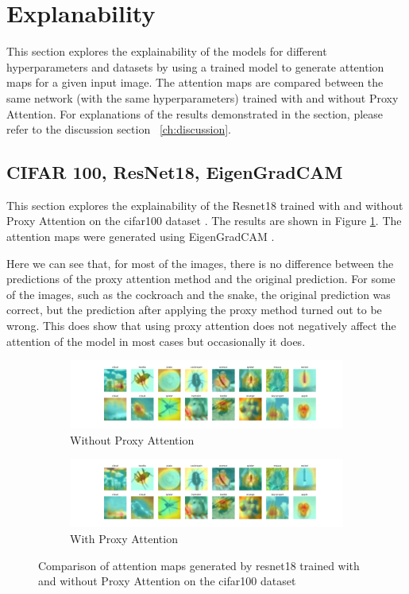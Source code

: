 \documentclass[a4paper,11pt,openright]{book}
\begin{document}
\section{Explanability}
This section explores the explainability of the models for different hyperparameters and datasets by using a trained model to generate attention maps for a given input image. The attention maps are compared between the same network (with the same hyperparameters) trained with and without Proxy Attention. For explanations of the results demonstrated in the section, please refer to the discussion section ~\ref{ch:discussion}.

\subsection{CIFAR 100, ResNet18, EigenGradCAM}
This section explores the explainability of the Resnet18 \cite{heDeepResidualLearning2016} trained with and without Proxy Attention on the cifar100 dataset \cite{krizhevskyLearningMultipleLayers}. The results are shown in Figure \ref{fig:resnet18_cifar100}. The attention maps were generated using EigenGradCAM \cite{banymuhammadEigenCAMVisualExplanations2021}.

Here we can see that, for most of the images, there is no difference between the predictions of the proxy attention method and the original prediction. For some of the images, such as the cockroach and the snake, the original prediction was correct, but the prediction after applying the proxy method turned out to be wrong. This does show that using proxy attention does not negatively affect the attention of the model in most cases but occasionally it does. 

\begin{figure}[!htb]
    \begin{subfigure}[b]{1\textwidth}
        \includegraphics[width=\linewidth]{images/cifar100_resnet18_noproxy_1.pdf}
        \caption{Without Proxy Attention}
    \end{subfigure}
    \begin{subfigure}[b]{1\textwidth}
        \includegraphics[width=\linewidth]{images/cifar100_resnet18_proxy_1.pdf}
        \caption{With Proxy Attention}
    \end{subfigure}
    
    \caption{Comparison of attention maps generated by resnet18 trained with and without Proxy Attention on the cifar100 dataset}
    \label{fig:resnet18_cifar100}
\end{figure}
\end{document}
